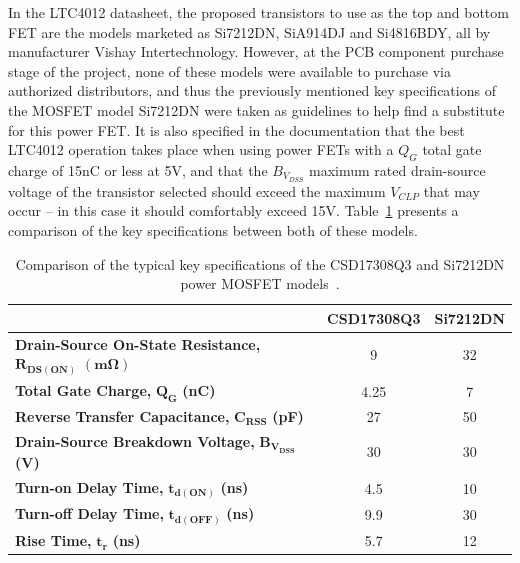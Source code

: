 In the LTC4012 datasheet, the proposed transistors to use as the top and bottom FET are the models marketed as Si7212DN, SiA914DJ and Si4816BDY, all by manufacturer Vishay Intertechnology. However, at the \gls{PCB} component purchase stage of the project, none of these models were available to purchase via authorized distributors, and thus the previously mentioned key specifications of the MOSFET model Si7212DN were taken as guidelines to help find a substitute for this power FET. It is also specified in the documentation that the best LTC4012 operation takes place when using power FETs with a $Q_G$ total gate charge of 15nC or less at 5V, and that the $B_{V_{DSS}}$ maximum rated drain-source voltage of the transistor selected should exceed the maximum $V_{CLP}$ that may occur -- in this case it should comfortably exceed 15V. Table~\ref{tab:top_FET_comparison} presents a comparison of the key specifications between both of these models.

\begingroup
\begin{table}[h]
	\caption{Comparison of the typical key specifications of the CSD17308Q3 and Si7212DN power MOSFET models~\cite{CSD17308Q3,Si7212DN}.}
	\label{tab:top_FET_comparison}
	\centering%
	\begin{tabular}{lcc}
        \toprule
        {} & \textbf{CSD17308Q3} & \textbf{Si7212DN} \\
        \midrule
        \textbf{Drain-Source On-State Resistance,} $\mathbf{R_{DS(ON)}}$ $\mathbf{(m\Omega)}$ & 9 & 32 \\
		\midrule
		\textbf{Total Gate Charge,} $\mathbf{Q_G}$ \textbf{(nC)} & 4.25 & 7 \\
		\midrule
		\textbf{Reverse Transfer Capacitance,} $\mathbf{C_{RSS}}$ \textbf{(pF)} & 27 & 50 \\
		\midrule
		\textbf{Drain-Source Breakdown Voltage,} $\mathbf{B_{V_{DSS}}}$ \textbf{(V)} & 30 & 30 \\
		\midrule
		\textbf{Turn-on Delay Time,} $\mathbf{t_{d(ON)}}$ \textbf{(ns)} & 4.5 & 10 \\
		\textbf{Turn-off Delay Time,} $\mathbf{t_{d(OFF)}}$ \textbf{(ns)} & 9.9 & 30 \\
		\textbf{Rise Time,} $\mathbf{t_r}$ \textbf{(ns)} & 5.7 & 12 \\
        \bottomrule
    \end{tabular}
\end{table}
\endgroup

